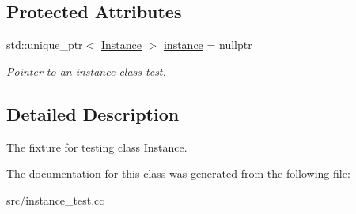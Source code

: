 \subsection*{Protected Attributes}
\begin{DoxyCompactItemize}
\item 
\hypertarget{class_instance_test_ae818f7a311cce549e005cd651a5e4ff1}{}\label{class_instance_test_ae818f7a311cce549e005cd651a5e4ff1} 
std\+::unique\+\_\+ptr$<$ \hyperlink{classae_1_1_instance}{Instance} $>$ \hyperlink{class_instance_test_ae818f7a311cce549e005cd651a5e4ff1}{instance} = nullptr
\begin{DoxyCompactList}\small\item\em Pointer to an instance class test. \end{DoxyCompactList}\end{DoxyCompactItemize}


\subsection{Detailed Description}
The fixture for testing class Instance. 

The documentation for this class was generated from the following file\+:\begin{DoxyCompactItemize}
\item 
src/instance\+\_\+test.\+cc\end{DoxyCompactItemize}
